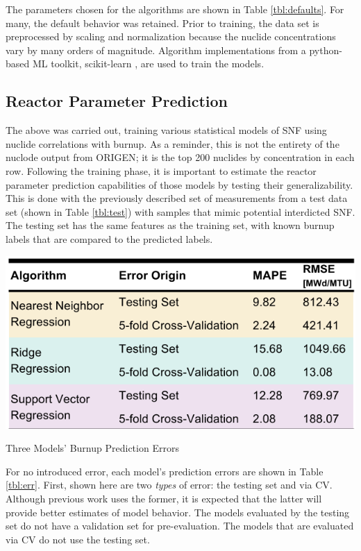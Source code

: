 The parameters chosen for the algorithms are shown in Table \ref{tbl:defaults}.
For many, the default behavior was retained. Prior to training, the data set is
preprocessed by scaling and normalization because the nuclide concentrations
vary by many orders of magnitude. Algorithm implementations from a python-based
\gls{ML} toolkit, scikit-learn \cite{scikit}, are used to train the
models.

\subsection{Reactor Parameter Prediction}
\label{sec:rxtrparam}

The above was carried out, training various statistical models of \gls{SNF}
using nuclide correlations with burnup. As a reminder, this is not the entirety
of the nuclode output from \gls{ORIGEN}; it is the top 200 nuclides by
concentration in each row. Following the training phase, it is important to
estimate the reactor parameter prediction capabilities of those models by
testing their generalizability.  This is done with the previously described set
of measurements from a test data set (shown in Table \ref{tbl:test}) with
samples that mimic potential interdicted \gls{SNF}. The testing set has the
same features as the training set, with known burnup labels that are compared
to the predicted labels. 

\begin{table}[!htb]
  \centering
  \includegraphics[width=0.8\linewidth]{./chapters/method/results1.png}
  \caption{Three Models' Burnup Prediction Errors}
  \label{tbl:err}
\end{table}

For no introduced error, each model's prediction errors are shown in Table
\ref{tbl:err}.  First, shown here are two \textit{types} of error: the testing
set and via \gls{CV}.  Although previous work uses the former, it is expected
that the latter will provide better estimates of model behavior.  The models
evaluated by the testing set do not have a validation set for pre-evaluation.
The models that are evaluated via \gls{CV} do not use the testing set. 

